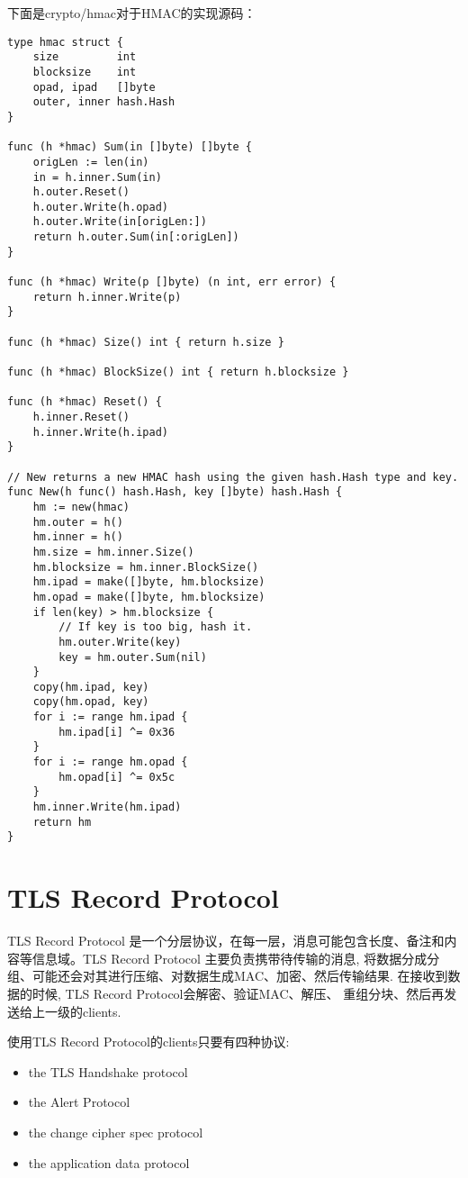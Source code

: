 \documentclass[a4paper]{ctexart}
\begin{document}
下面是crypto/hmac对于HMAC的实现源码：
\begin{lstlisting}[frame=single, stepnumber=5, firstnumber=1, caption={Go中Hmac的实现}]
type hmac struct {
	size         int
	blocksize    int
	opad, ipad   []byte
	outer, inner hash.Hash
}

func (h *hmac) Sum(in []byte) []byte {
	origLen := len(in)
	in = h.inner.Sum(in)
	h.outer.Reset()
	h.outer.Write(h.opad)
	h.outer.Write(in[origLen:])
	return h.outer.Sum(in[:origLen])
}

func (h *hmac) Write(p []byte) (n int, err error) {
	return h.inner.Write(p)
}

func (h *hmac) Size() int { return h.size }

func (h *hmac) BlockSize() int { return h.blocksize }

func (h *hmac) Reset() {
	h.inner.Reset()
	h.inner.Write(h.ipad)
}

// New returns a new HMAC hash using the given hash.Hash type and key.
func New(h func() hash.Hash, key []byte) hash.Hash {
	hm := new(hmac)
	hm.outer = h()
	hm.inner = h()
	hm.size = hm.inner.Size()
	hm.blocksize = hm.inner.BlockSize()
	hm.ipad = make([]byte, hm.blocksize)
	hm.opad = make([]byte, hm.blocksize)
	if len(key) > hm.blocksize {
		// If key is too big, hash it.
		hm.outer.Write(key)
		key = hm.outer.Sum(nil)
	}
	copy(hm.ipad, key)
	copy(hm.opad, key)
	for i := range hm.ipad {
		hm.ipad[i] ^= 0x36
	}
	for i := range hm.opad {
		hm.opad[i] ^= 0x5c
	}
	hm.inner.Write(hm.ipad)
	return hm
}
\end{lstlisting}


\section{TLS Record Protocol}
TLS Record Protocol 是一个分层协议，在每一层，消息可能包含长度、备注和内容等信息域。TLS Record Protocol 主要负责携带待传输的消息,
将数据分成分组、可能还会对其进行压缩、对数据生成MAC、加密、然后传输结果. 在接收到数据的时候, TLS Record Protocol会解密、验证MAC、解压、
重组分块、然后再发送给上一级的clients.

使用TLS Record Protocol的clients只要有四种协议: 
\begin{itemize}
  \item the TLS Handshake protocol
  \item the Alert Protocol
  \item the change cipher spec protocol
  \item the application data protocol
\end{itemize}
\end{document}
